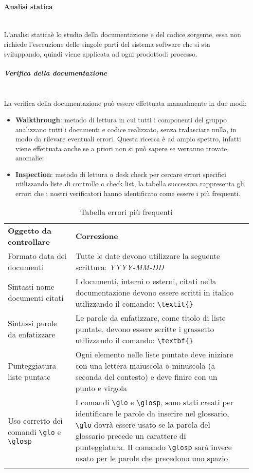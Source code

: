 \paragraph{Analisi statica}\mbox{}\\ [1mm]
L'analisi statica\glosp è lo studio della documentazione e del codice sorgente, essa non richiede l'esecuzione delle singole parti del sistema software che si sta sviluppando, quindi viene applicata ad ogni prodotto\glosp di processo\glo.
\subparagraph*{Verifica della documentazione} \mbox{} \\ [1mm] 
La verifica della documentazione può essere effettuata manualmente in due modi:
\begin{itemize}
	\item \textbf{Walkthrough}: metodo di lettura in cui tutti i componenti del gruppo analizzano tutti i documenti e codice realizzato, senza tralasciare nulla, in modo da rilevare eventuali errori. Questa ricerca è ad ampio spettro, infatti viene effettuata anche se a priori non si può sapere se verranno trovate anomalie;
	\item \textbf{Inspection}: metodo di lettura o desk check per cercare errori specifici utilizzando liste di controllo o check list, la tabella successiva rappresenta gli errori che i nostri verificatori hanno identificato come essere i più frequenti.
\end{itemize}
\setcounter{table}{0}
\begin{longtable} {
		>{}p{55mm} 
		>{}p{55mm}
		>{}p{0mm}}
	\rowcolor{gray!50}
	\textbf{Oggetto da controllare} & \textbf{Correzione} & \TBstrut \\[2mm]
	Formato data dei documenti & Tutte le date devono utilizzare la seguente scrittura: \textit{YYYY-MM-DD}  &  \TBstrut \\[2mm]
	Sintassi nome documenti citati & I documenti, interni o esterni, citati nella documentazione devono essere scritti in italico utilizzando il comando: \verb|\textit{}|  &  \TBstrut \\[2mm]
	Sintassi parole da enfatizzare & Le parole da enfatizzare, come titolo di liste puntate, devono essere scritte i grassetto utilizzando il comando: \verb|\textbf{}|  &  \TBstrut \\[2mm]
	Punteggiatura liste puntate & Ogni elemento nelle liste puntate deve iniziare con una lettera maiuscola o minuscola (a seconda del contesto) e deve finire con un punto e virgola &  \TBstrut \\[2mm]
	Uso corretto dei comandi \verb|\glo| e \verb|\glosp| & I comandi \verb|\glo| e \verb|\glosp|, sono stati creati per identificare le parole da inserire nel glossario, \verb|\glo| dovrà essere usato se la parola del glossario precede un carattere di punteggiatura. Il comando \verb|\glosp| sarà invece usato per le parole che precedono uno spazio &  \TBstrut \\	[2mm]
	\rowcolor{white}
	\caption{Tabella errori più frequenti}
\end{longtable}

